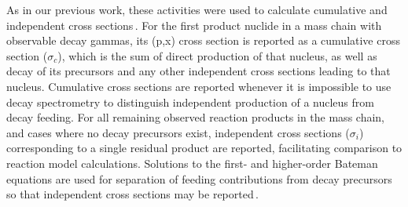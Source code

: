 As in our previous work, these activities were used to calculate 
cumulative and independent cross sections\,\cite{Voyles2018a}.
For the first product nuclide in a mass chain with observable decay gammas, its (p,x) cross section is reported as a cumulative cross section ($\sigma_c$), which is the sum of direct production of that nucleus, as well as decay of its  precursors and any other independent cross sections leading to that nucleus. 
Cumulative cross sections are reported whenever it is impossible to use decay spectrometry to distinguish independent production of a nucleus from decay feeding.
For all remaining observed reaction products in the mass chain, and cases where no decay precursors exist, independent cross sections  ($\sigma_i$) corresponding to a single 
residual product are reported, 
facilitating comparison to reaction model calculations.  
Solutions to the first- and higher-order  Bateman equations are used for separation of  feeding contributions from decay precursors so that  independent cross sections may be reported\,\cite{bateman1910solution,Cetnar2006}.







